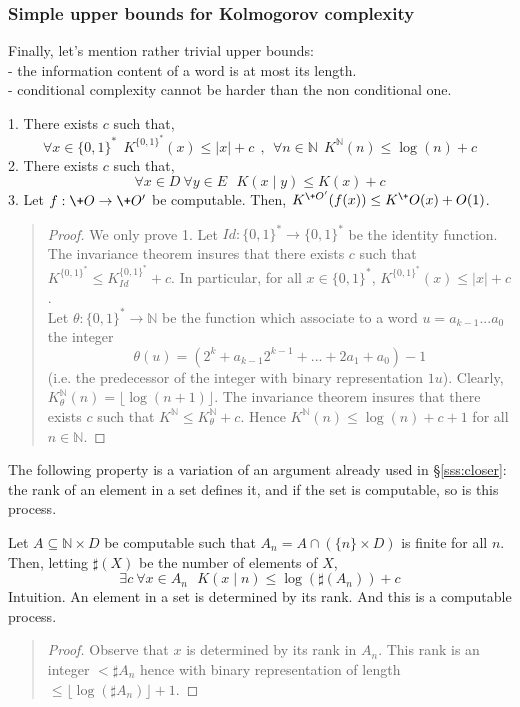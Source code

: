 \subsubsection{Simple upper bounds for Kolmogorov complexity}
Finally, let's mention rather trivial upper bounds:
\\- the information content of a word is at most its length.
\\- conditional complexity cannot be harder than the non conditional
one.
\begin{proposition}\label{p:bound}
1. There exists $c$ such that,
$$
\forall x\in{\{0,1\}^*}\ \ K^{\{0,1\}^*}(x)\leq |x|+c
\ \ ,\ \
\forall n\in{\mathbb N}\ \ K^{\mathbb N}(n)\leq \log(n)+c
$$
2. There exists $c$ such that,
$$
\forall x\in D\ \forall y\in E\ \ \ K(x\mid y)\leq K(x)+c
$$
3. Let $f:\+O\to\+O'$ be computable.
Then, $K^{\+O'}(f(x)) \leq K^\+O(x) +O(1)$.
\end{proposition}
{\small\begin{quote}
\begin{proof}
We only prove 1.
Let $Id:{\{0,1\}^*}\to{\{0,1\}^*}$ be the identity function.
The invariance theorem insures that there exists $c$ such that
$K^{\{0,1\}^*} \leq K^{\{0,1\}^*}_{Id} + c$.
In particular,
for all $x\in{\{0,1\}^*}$, $K^{\{0,1\}^*}(x)\leq |x|+c$.
\\
Let $\theta:{\{0,1\}^*}\to{\mathbb N}$ be the function which associate to a word
$u=a_{k-1}...a_0$ the integer
$$
\theta(u) = (2^k+a_{k-1}2^{k-1}+...+2a_1+a_0) -1
$$
(i.e. the predecessor of the integer with binary representation $1u$).
Clearly,
$K^{\mathbb N}_\theta(n)=\lfloor \log(n+1)\rfloor$.
The invariance theorem insures that there exists $c$ such that
$K^{\mathbb N} \leq K^{\mathbb N}_\theta + c$. Hence $K^{\mathbb N}(n)\leq \log(n)+c+1$
for all $n\in{\mathbb N}$.
\end{proof}
\end{quote}}
The following property is a variation of an argument
already used in \S\ref{sss:closer}: the rank of an element
in a set defines it, and if the set is computable,
so is this process.
\begin{proposition}\label{p:rank}
Let $A\subseteq {\mathbb N}\times D$ be computable such that
$A_n = A\cap(\{n\}\times D)$ is finite for all $n$.
Then, letting $\sharp(X)$ be the number of elements of $X$,
$$
\exists c\ \forall x\in A_n\ \ \
K(x\mid n) \leq \log(\sharp(A_n))+c
$$
Intuition. An element in a set is determined by its rank.
And this is a computable process.
\end{proposition}
{\small\begin{quote}
\begin{proof}
Observe that $x$ is determined by its rank in $A_n$.
This rank is an integer $<\sharp A_n$ hence with binary
representation of length $\leq\lfloor\log(\sharp A_n)\rfloor+1$.
\end{proof}
\end{quote}}
